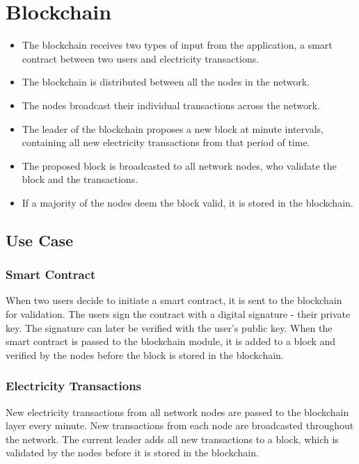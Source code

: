 \section{Blockchain}
\begin{itemize}
\item The blockchain receives two types of input from the application, a smart contract between two users and electricity transactions.
\item The blockchain is distributed between all the nodes in the network. 
\item The nodes broadcast their individual transactions across the network.
\item The leader of the blockchain proposes a new block at minute intervals, containing all new electricity transactions from that period of time.
\item The proposed block is broadcasted to all network nodes, who validate the block and the transactions.
\item If a majority of the nodes deem the block valid, it is stored in the blockchain.
\end{itemize}


\subsection{Use Case}

\subsubsection*{Smart Contract}
When two users decide to initiate a smart contract, it is sent to the blockchain for validation. The users sign the contract with a digital signature - their private key. The signature can later be verified with the user's public key.
When the smart contract is passed to the blockchain module, it is added to a block and verified by the nodes before the block is stored in the blockchain.
 
\subsubsection*{Electricity Transactions}
New electricity transactions from all network nodes are passed to the blockchain layer every minute. New transactions from each node are broadcasted throughout the network. The current leader adds all new transactions to a block, which is validated by the nodes before it is stored in the blockchain. 



